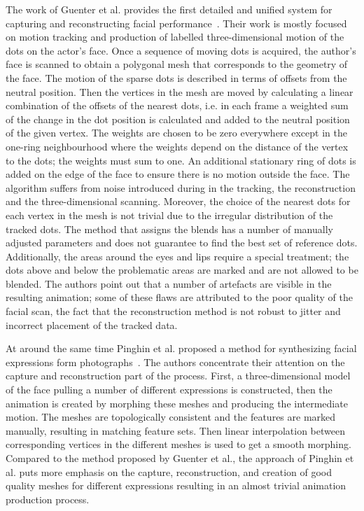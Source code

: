 The work of Guenter et al. provides the first detailed and unified system for capturing and reconstructing facial performance~\cite{Guenter:1998}. Their work is mostly focused on motion tracking and production of labelled three-dimensional motion of the dots on the actor's face. Once a sequence of  moving dots is acquired, the author's face is scanned to obtain a polygonal mesh that corresponds to the geometry of the face. The motion of the sparse dots is described in terms of offsets from the neutral position. Then the vertices in the mesh are moved by calculating a linear combination of the offsets of the nearest dots, i.e. in each frame a weighted sum of the change in the dot position is calculated and added to the neutral position of the given vertex. The weights are chosen to be zero everywhere except in the one-ring neighbourhood where the weights depend on the distance of the vertex to the dots; the weights must sum to one. An additional stationary ring of dots is added on the edge of the face to ensure there is no motion outside the face. The algorithm suffers from noise introduced during in the tracking, the reconstruction and the three-dimensional scanning. Moreover, the choice of the nearest dots for each vertex in the mesh is not trivial due to the irregular distribution of the tracked dots. The method that assigns the blends has a number of manually adjusted parameters and does not guarantee to find the best set of reference dots. Additionally, the areas around the eyes and lips require a special treatment; the dots above and below the problematic areas are marked and are not allowed to be blended. The authors point out that a number of artefacts are visible in the resulting animation; some of these flaws are attributed to the poor quality of the facial scan, the fact that the reconstruction method is not robust to jitter and incorrect placement of the tracked data.

At around the same time Pinghin et al. proposed a method for synthesizing facial expressions form photographs~\cite{Pighin:1998}. The authors concentrate their attention on the capture and reconstruction part of the process. First, a three-dimensional model of the face pulling a number of different expressions is constructed, then the animation is created by morphing these meshes and producing the intermediate motion. The meshes are topologically consistent and the features are marked manually, resulting in matching feature sets. Then linear interpolation between corresponding vertices in the different meshes is used to get a smooth morphing. Compared to the method proposed by Guenter et al., the approach of Pinghin et al. puts more emphasis on the capture, reconstruction, and creation of good quality meshes for different expressions resulting in an almost trivial animation production process.

